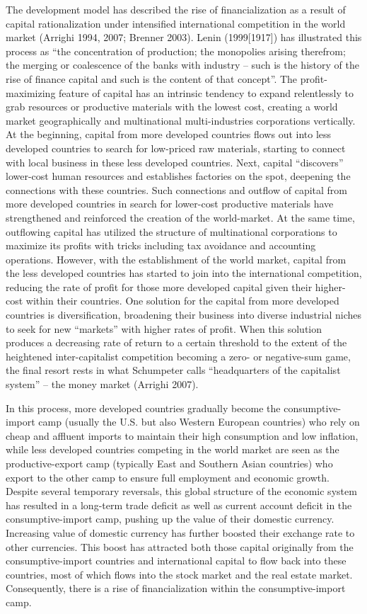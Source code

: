 \documentclass[
]{article}
\begin{document}
The development model has described the rise of financialization as a
result of capital rationalization under intensified international
competition in the world market (Arrighi 1994, 2007; Brenner 2003).
Lenin (1999{[}1917{]}) has illustrated this process as ``the
concentration of production; the monopolies arising therefrom; the
merging or coalescence of the banks with industry -- such is the history
of the rise of finance capital and such is the content of that
concept''. The profit-maximizing feature of capital has an intrinsic
tendency to expand relentlessly to grab resources or productive
materials with the lowest cost, creating a world market geographically
and multinational multi-industries corporations vertically. At the
beginning, capital from more developed countries flows out into less
developed countries to search for low-priced raw materials, starting to
connect with local business in these less developed countries. Next,
capital ``discovers'' lower-cost human resources and establishes
factories on the spot, deepening the connections with these countries.
Such connections and outflow of capital from more developed countries in
search for lower-cost productive materials have strengthened and
reinforced the creation of the world-market. At the same time,
outflowing capital has utilized the structure of multinational
corporations to maximize its profits with tricks including tax avoidance
and accounting operations. However, with the establishment of the world
market, capital from the less developed countries has started to join
into the international competition, reducing the rate of profit for
those more developed capital given their higher-cost within their
countries. One solution for the capital from more developed countries is
diversification, broadening their business into diverse industrial
niches to seek for new ``markets'' with higher rates of profit. When
this solution produces a decreasing rate of return to a certain
threshold to the extent of the heightened inter-capitalist competition
becoming a zero- or negative-sum game, the final resort rests in what
Schumpeter calls ``headquarters of the capitalist system'' -- the money
market (Arrighi 2007).

In this process, more developed countries gradually become the
consumptive-import camp (usually the U.S. but also Western European
countries) who rely on cheap and affluent imports to maintain their high
consumption and low inflation, while less developed countries competing
in the world market are seen as the productive-export camp (typically
East and Southern Asian countries) who export to the other camp to
ensure full employment and economic growth. Despite several temporary
reversals, this global structure of the economic system has resulted in
a long-term trade deficit as well as current account deficit in the
consumptive-import camp, pushing up the value of their domestic
currency. Increasing value of domestic currency has further boosted
their exchange rate to other currencies. This boost has attracted both
those capital originally from the consumptive-import countries and
international capital to flow back into these countries, most of which
flows into the stock market and the real estate market. Consequently,
there is a rise of financialization within the consumptive-import camp.
\end{document}

